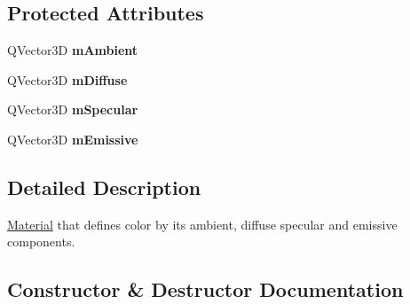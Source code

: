 \subsection*{Protected Attributes}
\begin{DoxyCompactItemize}
\item 
\mbox{\label{class_geometry_engine_1_1_geometry_material_1_1_color_material_ac77fb2bf46f1645848fc9e201b6ce6dd}} 
Q\+Vector3D {\bfseries m\+Ambient}
\item 
\mbox{\label{class_geometry_engine_1_1_geometry_material_1_1_color_material_ae66ee85dbfbb7a626fee1ea9062b2b64}} 
Q\+Vector3D {\bfseries m\+Diffuse}
\item 
\mbox{\label{class_geometry_engine_1_1_geometry_material_1_1_color_material_aa998b9dc2235f028454ead10148c4d15}} 
Q\+Vector3D {\bfseries m\+Specular}
\item 
\mbox{\label{class_geometry_engine_1_1_geometry_material_1_1_color_material_a782f506d3c09af477a4cc9643dd57e6f}} 
Q\+Vector3D {\bfseries m\+Emissive}
\end{DoxyCompactItemize}


\subsection{Detailed Description}
\mbox{\hyperlink{class_geometry_engine_1_1_geometry_material_1_1_material}{Material}} that defines color by its ambient, diffuse specular and emissive components. 

\subsection{Constructor \& Destructor Documentation}
\mbox{\label{class_geometry_engine_1_1_geometry_material_1_1_color_material_af445424ce4cb91403b9623cee72fdf92}} 
